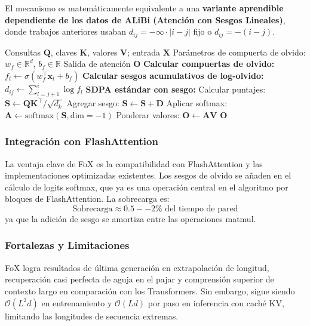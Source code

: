 El mecanismo es matemáticamente equivalente a una \textbf{variante aprendible dependiente de los datos de ALiBi (Atención con Sesgos Lineales)}, donde trabajos anteriores usaban $d_{ij} = -\infty \cdot |i-j|$ fijo o $d_{ij} = -(i-j)$.

\begin{algorithm}[H]
\caption{FoX: Atención con Olvido y Sesgo de Actualidad}
\begin{algorithmic}[1]
\Require Consultas $\mathbf{Q}$, claves $\mathbf{K}$, valores $\mathbf{V}$; entrada $\mathbf{X}$
\Require Parámetros de compuerta de olvido: $w_f \in \mathbb{R}^d$, $b_f \in \mathbb{R}$
\Ensure Salida de atención $\mathbf{O}$
\State \textbf{Calcular compuertas de olvido:}
    \State $f_t \gets \sigma(w_f^\top \mathbf{x}_t + b_f)$ 
\EndFor
\State \textbf{Calcular sesgos acumulativos de log-olvido:}
        \State $d_{ij} \gets \sum_{l=j+1}^{i} \log f_l$ 
    \EndFor
\EndFor
\State \textbf{SDPA estándar con sesgo:}
\State Calcular puntajes: $\mathbf{S} \gets \mathbf{Q}\mathbf{K}^\top / \sqrt{d_k}$
\State Agregar sesgo: $\mathbf{S} \gets \mathbf{S} + \mathbf{D}$
\State Aplicar softmax: $\mathbf{A} \gets \text{softmax}(\mathbf{S}, \text{dim}=-1)$
\State Ponderar valores: $\mathbf{O} \gets \mathbf{A} \mathbf{V}$
\Return $\mathbf{O}$
\end{algorithmic}
\end{algorithm}

\subsubsection{Integración con FlashAttention}

La ventaja clave de FoX es la compatibilidad con FlashAttention y las implementaciones optimizadas existentes. Los sesgos de olvido se añaden en el cálculo de logits softmax, que ya es una operación central en el algoritmo por bloques de FlashAttention. La sobrecarga es:
\[
\text{Sobrecarga} \approx 0.5--2\% \text{ del tiempo de pared}
\]
ya que la adición de sesgo se amortiza entre las operaciones matmul.

\subsubsection{Fortalezas y Limitaciones}

FoX logra resultados de última generación en extrapolación de longitud, recuperación casi perfecta de aguja en el pajar y comprensión superior de contexto largo en comparación con los Transformers. Sin embargo, sigue siendo $\mathcal{O}(L^2 d)$ en entrenamiento y $\mathcal{O}(L d)$ por paso en inferencia con caché KV, limitando las longitudes de secuencia extremas.

